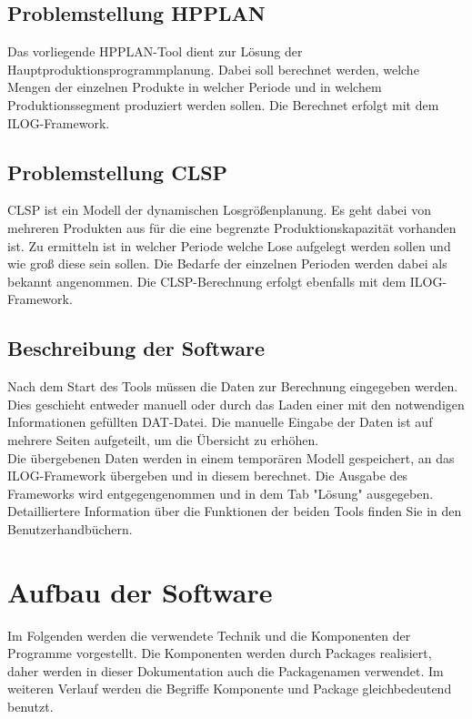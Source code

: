 \documentclass[12pt,a4paper, listof=entryprefix, bibliography=totocnumbered,toc=listofnumbered,lof=listofnumbered]{scrartcl}
\begin{document}
\subsection{Problemstellung HPPLAN}
Das vorliegende HPPLAN-Tool dient zur Lösung der Hauptproduktionsprogrammplanung. Dabei soll berechnet werden, welche Mengen der einzelnen Produkte in welcher Periode und in welchem Produktionssegment produziert werden sollen. Die Berechnet erfolgt mit dem ILOG-Framework.

\subsection{Problemstellung CLSP}
CLSP ist ein Modell der dynamischen Losgrößenplanung. Es geht dabei von mehreren Produkten aus für die eine begrenzte Produktionskapazität vorhanden ist. Zu ermitteln ist in welcher Periode welche Lose aufgelegt werden sollen und wie groß diese sein sollen. Die Bedarfe der einzelnen Perioden werden dabei als bekannt angenommen. Die CLSP-Berechnung erfolgt ebenfalls mit dem ILOG-Framework.

\subsection{Beschreibung der Software}
Nach dem Start des Tools müssen die Daten zur Berechnung eingegeben werden. Dies geschieht entweder manuell oder durch das Laden einer mit den notwendigen Informationen gefüllten DAT-Datei. Die manuelle Eingabe der Daten ist auf mehrere Seiten aufgeteilt, um die Übersicht zu erhöhen.
\\
Die übergebenen Daten werden in einem temporären Modell gespeichert, an das ILOG-Framework übergeben und in diesem berechnet. Die Ausgabe des Frameworks wird entgegengenommen und in dem Tab "Lösung" ausgegeben.
\\
Detailliertere Information über die Funktionen der beiden Tools finden Sie in den Benutzerhandbüchern.



\section{Aufbau der Software}
Im Folgenden werden die verwendete Technik und die Komponenten der Programme vorgestellt. Die Komponenten werden durch Packages realisiert, daher werden in dieser Dokumentation auch die Packagenamen verwendet. Im weiteren Verlauf werden die Begriffe Komponente und Package gleichbedeutend benutzt.
\end{document}
